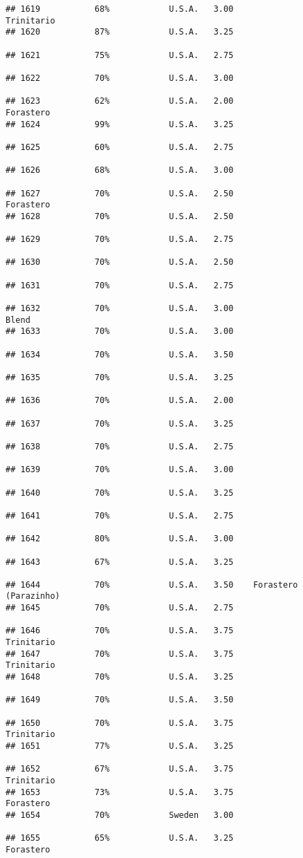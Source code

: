 \documentclass[
]{article}
\begin{document}
\begin{verbatim}
## 1619           68%            U.S.A.   3.00               Trinitario
## 1620           87%            U.S.A.   3.25                         
## 1621           75%            U.S.A.   2.75                         
## 1622           70%            U.S.A.   3.00                         
## 1623           62%            U.S.A.   2.00                Forastero
## 1624           99%            U.S.A.   3.25                         
## 1625           60%            U.S.A.   2.75                         
## 1626           68%            U.S.A.   3.00                         
## 1627           70%            U.S.A.   2.50                Forastero
## 1628           70%            U.S.A.   2.50                         
## 1629           70%            U.S.A.   2.75                         
## 1630           70%            U.S.A.   2.50                         
## 1631           70%            U.S.A.   2.75                         
## 1632           70%            U.S.A.   3.00                    Blend
## 1633           70%            U.S.A.   3.00                         
## 1634           70%            U.S.A.   3.50                         
## 1635           70%            U.S.A.   3.25                         
## 1636           70%            U.S.A.   2.00                         
## 1637           70%            U.S.A.   3.25                         
## 1638           70%            U.S.A.   2.75                         
## 1639           70%            U.S.A.   3.00                         
## 1640           70%            U.S.A.   3.25                         
## 1641           70%            U.S.A.   2.75                         
## 1642           80%            U.S.A.   3.00                         
## 1643           67%            U.S.A.   3.25                         
## 1644           70%            U.S.A.   3.50    Forastero (Parazinho)
## 1645           70%            U.S.A.   2.75                         
## 1646           70%            U.S.A.   3.75               Trinitario
## 1647           70%            U.S.A.   3.75               Trinitario
## 1648           70%            U.S.A.   3.25                         
## 1649           70%            U.S.A.   3.50                         
## 1650           70%            U.S.A.   3.75               Trinitario
## 1651           77%            U.S.A.   3.25                         
## 1652           67%            U.S.A.   3.75               Trinitario
## 1653           73%            U.S.A.   3.75                Forastero
## 1654           70%            Sweden   3.00                         
## 1655           65%            U.S.A.   3.25                Forastero

\end{verbatim}
\end{document}
